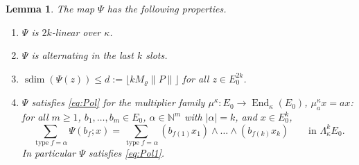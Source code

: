\documentclass[11pt]{amsart}
\newtheorem{lemma}[theorem]{Lemma}
\theoremstyle{definition}
\theoremstyle{remark}
\numberwithin{equation}{section}
\newcommand{\N}{\mathbb N}
\newcommand{\End}{\operatorname{End}}
\newcommand{\abs}[1]{\lvert #1\rvert}
\newcommand{\norm}[1]{\lVert #1\rVert}
\newcommand{\type}{\operatorname{type}}
\newcommand{\sdim}{\operatorname{sdim}}
\theoremstyle{plain}
\theoremstyle{definition}
\theoremstyle{plain}
\begin{document}
\begin{lemma}\label{lem:Psi}
The map $\Psi$ has the following properties.
\begin{enumerate}
\item[($\Psi$1)] $\Psi$ is $2k$\nobreakdash-linear over $\kappa$.
\item[($\Psi$2)] $\Psi$ is alternating in the last $k$ slots.
\item[($\Psi$3)] $\sdim(\Psi(z))\le d:=\lfloor kM_\varrho\norm P\rfloor$ for \emph{all} $z\in E_0^{2k}$.
\item[($\Psi$4)] $\Psi$ satisfies \eqref{eq:Pol} for the multiplier family $\mu^\kappa\colon E_0\to\End_\kappa(E_0)$,
$\mu^\kappa_ax=ax$: for all $m\ge1$, $b_1,\dots,b_m\in E_0$, $\alpha\in\N^m$ with $\abs\alpha=k$, and $x\in E_0^k$,
\[
\sum_{\type f=\alpha}\Psi(b_f;x)=\sum_{\type f=\alpha}(b_{f(1)}x_1)\wedge\dots\wedge(b_{f(k)}x_k)\qquad\text{in }\Lambda^k_\kappa E_0 .
\]
In particular $\Psi$ satisfies \eqref{eq:Pol1}.
\end{enumerate}
\end{lemma}
\end{document}
